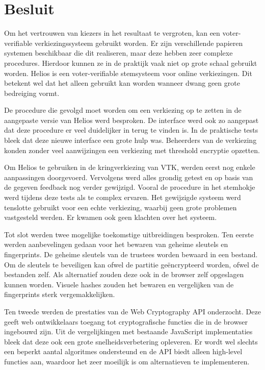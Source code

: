 %
%

\chapter{Besluit}
\label{chap:besluit}

Om het vertrouwen van kiezers in het resultaat te vergroten, kan een voter-verifiable verkiezingssysteem gebruikt worden. Er zijn verschillende papieren systemen beschikbaar die dit realiseren, maar deze hebben zeer complexe procedures. Hierdoor kunnen ze in de praktijk vaak niet op grote schaal gebruikt worden. Helios is een voter-verifiable stemsysteem voor online verkiezingen. Dit betekent wel dat het alleen gebruikt kan worden wanneer dwang geen grote bedreiging vormt.

\npar De procedure die gevolgd moet worden om een verkiezing op te zetten in de aangepaste versie van Helios werd besproken. De interface werd ook zo aangepast dat deze procedure er veel duidelijker in terug te vinden is. In de praktische tests bleek dat deze nieuwe interface een grote hulp was. Beheerders van de verkiezing konden zonder veel aanwijzingen een verkiezing met threshold encryptie opzetten.

\npar Om Helios te gebruiken in de kringverkiezing van VTK, werden eerst nog enkele aanpassingen doorgevoerd. Vervolgens werd alles grondig getest en op basis van de gegeven feedback nog verder gewijzigd. Vooral de procedure in het stemhokje werd tijdens deze tests als te complex ervaren. Het gewijzigde systeem werd tenslotte gebruikt voor een echte verkiezing, waarbij geen grote problemen vastgesteld werden. Er kwamen ook geen klachten over het systeem.

\npar Tot slot werden twee mogelijke toekomstige uitbreidingen besproken. Ten eerste werden aanbevelingen gedaan voor het bewaren van geheime sleutels en fingerprints. De geheime sleutels van de trustees worden bewaard in een bestand. Om de sleutels te beveiligen kan ofwel de partitie ge\"encrypteerd worden, ofwel de bestanden zelf. Als alternatief zouden deze ook in de browser zelf opgeslagen kunnen worden. Visuele hashes zouden het bewaren en vergelijken van de fingerprints sterk vergemakkelijken.

\npar Ten tweede werden de prestaties van de Web Cryptography API onderzocht. Deze geeft web ontwikkelaars toegang tot cryptografische functies die in de browser ingebouwd zijn. Uit de vergelijkingen met bestaande JavaScript implementaties bleek dat deze ook een grote snelheidsverbetering opleveren. Er wordt wel slechts een beperkt aantal algoritmes ondersteund en de API biedt alleen high-level functies aan, waardoor het zeer moeilijk is om alternatieven te implementeren.
